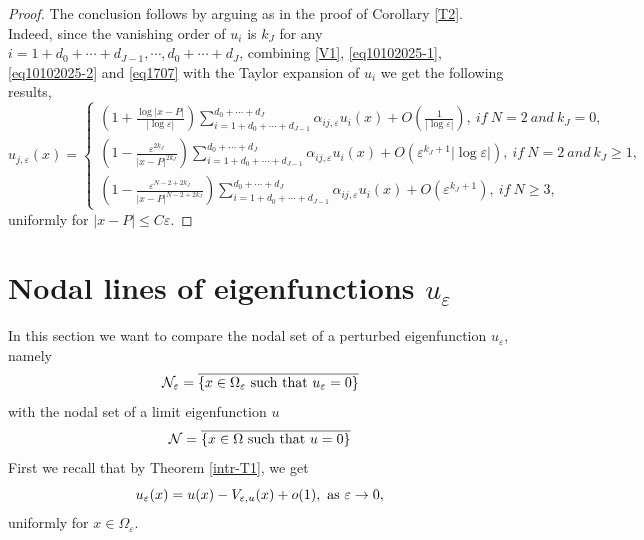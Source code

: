 \documentclass[11pt,reqno]{article}
\numberwithin{equation}{section}
\newcommand\e\varepsilon
\renewcommand\O\Omega
\newcommand{\Ma}{\color{blue}}
\begin{document}
\begin{proof}
The conclusion follows by arguing as in the proof of Corollary \ref{T2}. Indeed, since the vanishing order of  $u_i$ is   $k_J$ for any $i=1+d_0+\cdots+d_{J-1},\cdots,d_0+\cdots+d_{J}$, combining \eqref{V1}, \eqref{eq10102025-1}, \eqref{eq10102025-2} and \eqref{eq1707} with the Taylor expansion of $u_i$ we get the following results,
$$
u_{j,\e}(x)=\begin{cases}
              \displaystyle\left  (1+\frac{\log |x-P|}{|\log\e|}\right)\sum_{i=1+d_0+\cdots+d_{J-1}}^{d_0+\cdots+d_J}\alpha_{ij,\e}u_i(x)
              +O\left(\frac{1}{|\log\e|}\right),\  if \ N=2  \ and\ k_J=0,\\
				 \displaystyle \left(1-\frac{\e^{2k_J}}{|x-P|^{2k_J}}\right)\sum_{i=1+d_0+\cdots+d_{J-1}}^{d_0+\cdots+d_J}\alpha_{ij,\e}u_i(x)+O(\e^{k_J+1}|\log\e|),\  if  \ N=2  \ and\ k_J\ge1,\\
                 \displaystyle   \left(1-\frac{\e^{N-2+2k_J}}{|x-P|^{N-2+2k_J}}
				\right)\sum_{i=1+d_0+\cdots+d_{J-1}}^{d_0+\cdots+d_J}\alpha_{ij,\e}u_i(x)+O(\e^{k_J+1}), \ if\ N\ge 3,
                \end{cases} 
$$
uniformly for $|x-P|\leq C\e$.
\end{proof}



\section{Nodal lines of eigenfunctions $u_\e$}\label{sec-application}
	In this section we want to compare the nodal set of a perturbed eigenfunction $u_\e$, namely
	\begin{equation}
		\mathcal{N_\e}=\overline{\{x\in\O_\e\hbox{ such that }u_\e=0\}}
	\end{equation}
	with the nodal set of a limit eigenfunction $u$
	\begin{equation}
		\mathcal{N}=\overline{\{x\in\O\hbox{ such that }u=0\}}
	\end{equation}
      First we recall that by Theorem \ref{intr-T1}, we get
\begin{equation}\label{eq2901-1}
    u_\e(x)=u(x)-V_{\e,u}(x)+o(1), \ \hbox{as } \e\to0,
\end{equation}
 uniformly for $x\in \O_\e$. 
\end{document}
